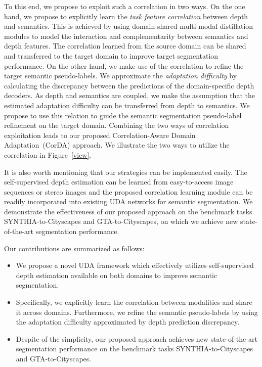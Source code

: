 \documentclass[10pt,twocolumn,letterpaper]{article}
\begin{document}
To this end, we propose to exploit such a correlation in two ways. On the one hand, we propose to explicitly learn the \textit{task feature correlation} between depth and semantics. This is achieved by using domain-shared multi-modal distillation modules to model the interaction and complementarity between semantics and depth features. The correlation learned from the source domain can be shared and transferred to the target domain to improve target segmentation performance. On the other hand, we make use of the correlation to refine the target semantic pseudo-labels. We approximate the \textit{adaptation difficulty} by calculating the discrepancy between the predictions of the domain-specific depth decoders. As depth and semantics are coupled, we make the assumption that the estimated adaptation difficulty can be transferred from depth to semantics. We propose to use this relation to guide the semantic segmentation pseudo-label refinement on the target domain. Combining the two ways of correlation exploitation leads to our proposed Correlation-Aware Domain Adaptation~(CorDA) approach. We illustrate the two ways to utilize the correlation in  Figure~\ref{view}.


It is also worth mentioning that our strategies can be implemented easily. The self-supervised depth estimation can be learned from easy-to-access image sequences or stereo images and the proposed correlation learning module can be readily incorporated into existing UDA networks for semantic segmentation. We demonstrate the effectiveness of our proposed approach on the benchmark tasks SYNTHIA-to-Cityscapes and GTA-to-Cityscapes, on which we achieve new state-of-the-art segmentation performance.

Our contributions are summarized as follows:
\begin{itemize}
\item We propose a novel UDA framework which effectively utilizes self-supervised depth estimation available on both domains to improve semantic segmentation. 
	\item Specifically, we explicitly learn the correlation between modalities and share it across domains. Furthermore, we refine the semantic pseudo-labels by using the adaptation difficulty approximated by depth prediction discrepancy.
	\item Despite of the simplicity, our proposed approach achieves new state-of-the-art segmentation performance on the benchmark tasks SYNTHIA-to-Cityscapes and GTA-to-Cityscapes.
\end{itemize}
\end{document}
